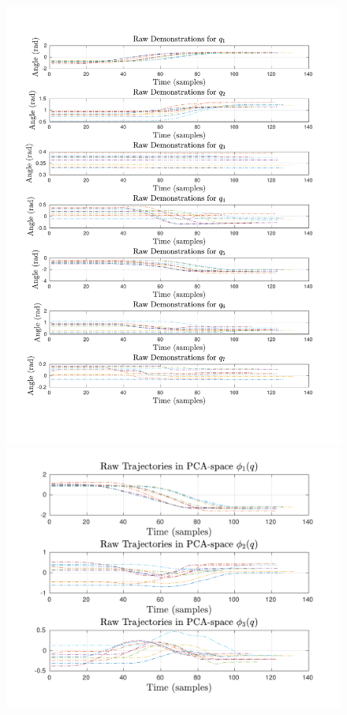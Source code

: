 \documentclass{article}
\begin{document}
\begin{figure}[!th] 
  \begin{minipage}{0.58\textwidth}
     	\centering 
     	\includegraphics[trim={1.2cm 2cm 1.7cm 2cm},clip,width=\linewidth]{../../src/JTDS_mat_lib/figures/raw_demos_pour.pdf}
  \end{minipage}
   \begin{minipage}{0.47\textwidth}
      	\centering
      	\includegraphics[trim={1.2cm 0.5cm 0.5cm 0.35cm},clip,width=\linewidth]{../../src/JTDS_mat_lib/figures/raw_demos_pca_pour.pdf}
      	\vspace{-5pt}
      	

\end{minipage}
\end{figure}
\end{document}
